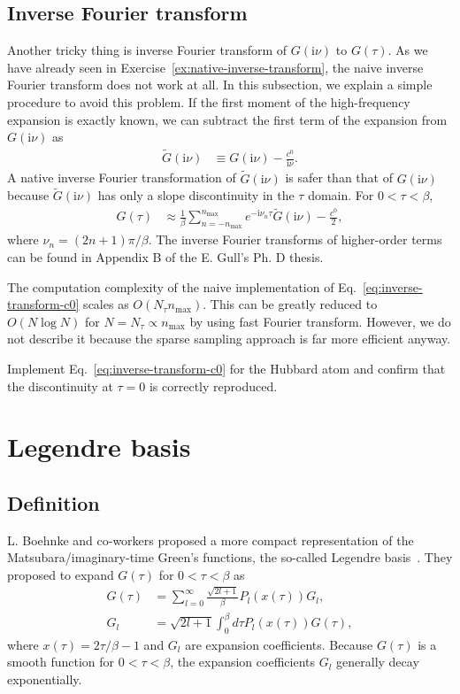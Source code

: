 \documentclass[submission, LectureNotes]{SciPost}
\newcommand\ii{\mathrm{i}}%
\newcommand\iv{\ii\nu}%
\begin{document}
\subsection{Inverse Fourier transform}\label{sec:inverse-fourier-transform}
Another tricky thing is inverse Fourier transform of $G(\iv)$ to $G(\tau)$.
As we have already seen in Exercise~\ref{ex:native-inverse-transform},
the naive inverse Fourier transform does not work at all.
In this subsection, we explain a simple procedure to avoid this problem.
If the first moment of the high-frequency expansion is exactly known,
we can subtract the first term of the expansion from $G(\iv)$ as
\begin{align}
    \tilde{G}(\iv) &\equiv G(\iv) - \frac{c^0}{\iv}.
\end{align}
A native inverse Fourier transformation of $\tilde{G}(\iv)$ is safer than that of $G(\iv)$ because 
$\tilde{G}(\iv)$ has only a slope discontinuity in the $\tau$ domain.
For $0 < \tau<\beta$,
\begin{align}
    G(\tau) &\approx \frac{1}{\beta} \sum_{n=-n_\mathrm{max}}^{n_\mathrm{max}} e^{-\ii \nu_n \tau }\tilde{G}(\iv) - \frac{c^0}{2},\label{eq:inverse-transform-c0}
\end{align}
where $\nu_n = (2n+1)\pi/\beta$.
The inverse Fourier transforms of higher-order terms can be found in Appendix B of the E. Gull's Ph. D thesis.

The computation complexity of the naive implementation of Eq.~\eqref{eq:inverse-transform-c0} scales as $O(N_\tau n_\mathrm{max})$.
This can be greatly reduced to $O(N\log N)$ for $N=N_\tau \propto n_\mathrm{max}$ by using fast Fourier transform.
However, we do not describe it because the sparse sampling approach is far more efficient anyway.

\begin{Exercise}
    Implement Eq.~\eqref{eq:inverse-transform-c0} for the Hubbard atom and confirm that the discontinuity at $\tau=0$ is correctly reproduced.
\end{Exercise}


\section{Legendre basis}
\subsection{Definition}
L. Boehnke and co-workers proposed a more compact representation of the Matsubara/imaginary-time Green's functions, the so-called Legendre basis~\cite{Boehnke:2011dd}.
They proposed to expand $G(\tau)$ for $0<\tau<\beta$ as
\begin{align}
    G(\tau) &= \sum_{l=0}^\infty \frac{\sqrt{2l+1}}{\beta} P_l(x(\tau)) G_l,\label{eq:legendre-gtau}\\
    G_l &= \sqrt{2l+1} \int_0^\beta d\tau P_l(x(\tau)) G(\tau),
\end{align}
where $x(\tau) = 2\tau/\beta -1$ and $G_l$ are expansion coefficients.
Because $G(\tau)$ is a smooth function for $0 < \tau < \beta$, the expansion coefficients $G_l$ generally decay exponentially.
\end{document}
